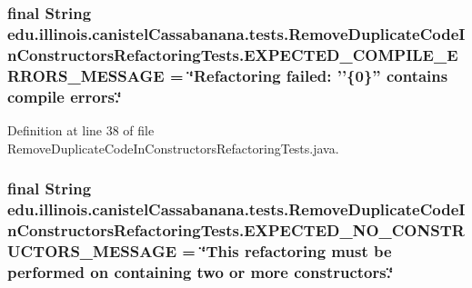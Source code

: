\hypertarget{classedu_1_1illinois_1_1canistelCassabanana_1_1tests_1_1RemoveDuplicateCodeInConstructorsRefactoringTests_a926cb04d4eaedbbf59ba8d0220147ec5}{
\subsubsection[{EXPECTED\_\-COMPILE\_\-ERRORS\_\-MESSAGE}]{\setlength{\rightskip}{0pt plus 5cm}final String {\bf edu.illinois.canistelCassabanana.tests.RemoveDuplicateCodeInConstructorsRefactoringTests.EXPECTED\_\-COMPILE\_\-ERRORS\_\-MESSAGE} = \char`\"{}Refactoring failed: ''\{0\}'' contains compile errors.\char`\"{}}}
\label{classedu_1_1illinois_1_1canistelCassabanana_1_1tests_1_1RemoveDuplicateCodeInConstructorsRefactoringTests_a926cb04d4eaedbbf59ba8d0220147ec5}


Definition at line 38 of file RemoveDuplicateCodeInConstructorsRefactoringTests.java.

\hypertarget{classedu_1_1illinois_1_1canistelCassabanana_1_1tests_1_1RemoveDuplicateCodeInConstructorsRefactoringTests_ab3af05be15455583ceda71e6a6587049}{
\subsubsection[{EXPECTED\_\-NO\_\-CONSTRUCTORS\_\-MESSAGE}]{\setlength{\rightskip}{0pt plus 5cm}final String {\bf edu.illinois.canistelCassabanana.tests.RemoveDuplicateCodeInConstructorsRefactoringTests.EXPECTED\_\-NO\_\-CONSTRUCTORS\_\-MESSAGE} = \char`\"{}This refactoring must be performed on containing two or more constructors.\char`\"{}}}
\label{classedu_1_1illinois_1_1canistelCassabanana_1_1tests_1_1RemoveDuplicateCodeInConstructorsRefactoringTests_ab3af05be15455583ceda71e6a6587049}


